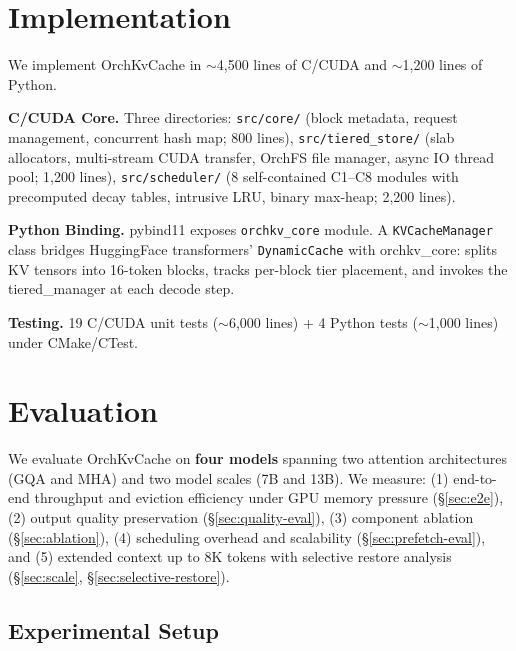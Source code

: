 \documentclass[conference]{IEEEtran}
\begin{document}
\section{Implementation}

We implement OrchKvCache in ${\sim}$4,500 lines of C/CUDA and ${\sim}$1,200 lines of Python.

\textbf{C/CUDA Core.} Three directories: \texttt{src/core/} (block metadata, request management, concurrent hash map; 800 lines), \texttt{src/tiered\_store/} (slab allocators, multi-stream CUDA transfer, OrchFS file manager, async IO thread pool; 1,200 lines), \texttt{src/scheduler/} (8 self-contained C1--C8 modules with precomputed decay tables, intrusive LRU, binary max-heap; 2,200 lines).

\textbf{Python Binding.} pybind11 exposes \texttt{orchkv\_core} module. A \texttt{KVCacheManager} class bridges HuggingFace transformers' \texttt{DynamicCache} with orchkv\_core: splits KV tensors into 16-token blocks, tracks per-block tier placement, and invokes the tiered\_manager at each decode step.

\textbf{Testing.} 19 C/CUDA unit tests (${\sim}$6,000 lines) + 4 Python tests (${\sim}$1,000 lines) under CMake/CTest.

\section{Evaluation}

We evaluate OrchKvCache on \textbf{four models} spanning two attention architectures (GQA and MHA) and two model scales (7B and 13B). We measure: (1) end-to-end throughput and eviction efficiency under GPU memory pressure (\S\ref{sec:e2e}), (2) output quality preservation (\S\ref{sec:quality-eval}), (3) component ablation (\S\ref{sec:ablation}), (4) scheduling overhead and scalability (\S\ref{sec:prefetch-eval}), and (5) extended context up to 8K tokens with selective restore analysis (\S\ref{sec:scale}, \S\ref{sec:selective-restore}).

\subsection{Experimental Setup}
\end{document}
